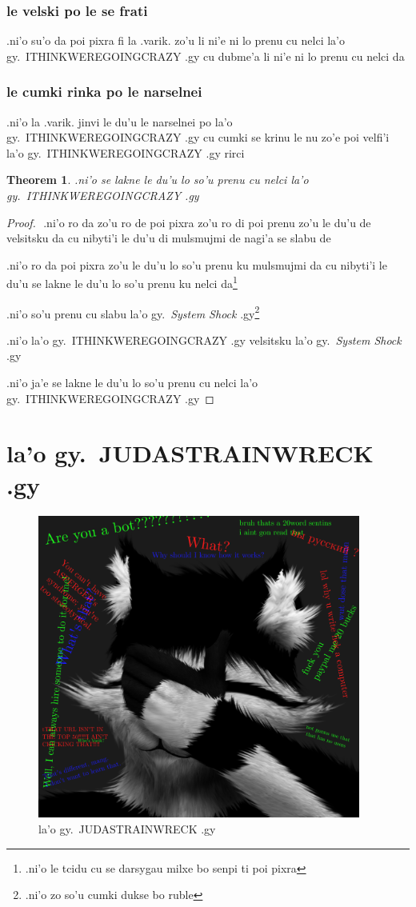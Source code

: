 \documentclass{report}
\newtheorem{thm}{Theorem}
\begin{document}
\subsection{le velski po le se frati}
.ni'o su'o da poi pixra fi la .varik. zo'u li ni'e ni lo prenu cu nelci la'o gy.\ ITHINKWEREGOINGCRAZY .gy cu dubme'a li ni'e ni lo prenu cu nelci da
\subsection{le cumki rinka po le narselnei}
.ni'o la .varik. jinvi le du'u le narselnei po la'o gy.\ ITHINKWEREGOINGCRAZY .gy  cu cumki se krinu le nu zo'e poi velfi'i la'o gy.\ ITHINKWEREGOINGCRAZY .gy rirci
\begin{thm}
.ni'o se lakne le du'u lo so'u prenu cu nelci la'o gy.\ ITHINKWEREGOINGCRAZY .gy
\end{thm}
\begin{proof}
${}$
.ni'o ro da zo'u ro de poi pixra zo'u ro di poi prenu zo'u le du'u de velsitsku da cu nibyti'i le du'u di mulsmujmi de nagi'a se slabu de

.ni'o ro da poi pixra zo'u le du'u lo so'u prenu ku mulsmujmi da cu nibyti'i le du'u se lakne le du'u lo so'u prenu ku nelci da\footnote{.ni'o le tcidu cu se darsygau milxe bo senpi ti poi pixra}

.ni'o so'u prenu cu slabu la'o gy.\ \textit{System Shock} .gy\footnote{.ni'o zo so'u cumki dukse bo ruble}

.ni'o la'o gy.\ ITHINKWEREGOINGCRAZY .gy velsitsku la'o gy.\ \textit{System Shock} .gy

.ni'o ja'e se lakne le du'u lo so'u prenu cu nelci la'o gy.\ ITHINKWEREGOINGCRAZY .gy
\end{proof}
\chapter{la'o gy.\ JUDASTRAINWRECK .gy}
\begin{figure}[ht]
	\centering
	\includegraphics[height=10cm]{judastrainwreck/judastrainwreck.png}
	\caption[center]{la'o gy.\ JUDASTRAINWRECK .gy}
\end{figure}
\end{document}
